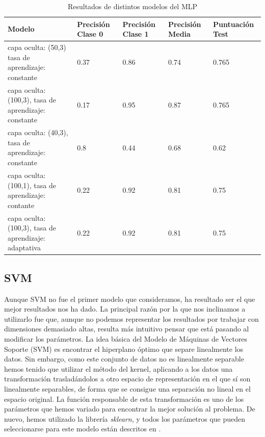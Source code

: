 \documentclass[journal,twoside]{JoPhA}
\begin{document}
\begin{table}[htb!]
	\begin{center}
		\caption{Resultados de distintos modelos del MLP}
		\begin{tabular}{| m{2.1cm} | m{1cm} | m{1cm} | m{1cm} | m{1.2cm} |}
			\hline
			Modelo & Precisión Clase 0 & Precisión Clase 1 & Precisión Media & Puntuación Test   \\ \hline
			capa oculta: (50,3) tasa de aprendizaje: constante & 0.37                & 0.86                & 0.74              & 0.765  \\ \hline
			capa oculta: (100,3), tasa de aprendizaje: constante & 0.17                & 0.95               & 0.87             & 0.765  \\ \hline
			capa oculta: (40,3), tasa de aprendizaje: constante & 0.8 & 0.44 & 0.68 & 0.62 \\ \hline
			capa oculta: (100,1), tasa de aprendizaje: contante & 0.22 & 0.92 & 0.81 & 0.75    \\ \hline
			capa oculta: (100,3), tasa de aprendizaje: adaptativa & 0.22 & 0.92 & 0.81 & 0.75 \\ \hline
			
		\end{tabular}
		
		\label{tabla:tabla_mlp}
	\end{center}
\end{table}


\subsection{SVM}

Aunque SVM no fue el primer modelo que consideramos, ha resultado ser el que mejor resultados nos ha dado. La principal razón por la que nos inclinamos a utilizarlo fue que, aunque no podemos representar los resultados por trabajar con dimensiones demasiado altas, resulta más intuitivo pensar que está pasando al modificar los parámetros. La idea básica del Modelo de Máquinas de Vectores Soporte (SVM) es encontrar el hiperplano óptimo que separe linealmente los datos. Sin embargo, como este conjunto de datos no es linealmente separable hemos tenido que utilizar el método del kernel, aplicando a los datos una transformación trasladándolos a otro espacio de representación en el que sí son linealmente separables, de forma que se consigue una separación no lineal en el espacio original. La función responsable de esta transformación es uno de los parámetros que hemos variado para encontrar la mejor solución al problema. De nuevo, hemos utilizado la librería \textit{sklearn}, y todos los parámetros que pueden seleccionarse para este modelo están descritos en \cite{svm}. \\
\end{document}
